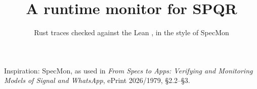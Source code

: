 

\title{A runtime monitor for SPQR}
\subtitle{Rust traces checked against the Lean , in the style of SpecMon}




\begin{frame}
  \titlepage
  \centering
  {\footnotesize\textcolor{trustc}{Inspiration: SpecMon, as used in \emph{From Specs to Apps:
  Verifying and Monitoring Models of Signal and WhatsApp}, ePrint 2026/1979, \S2.2--\S3.}}
\end{frame}

